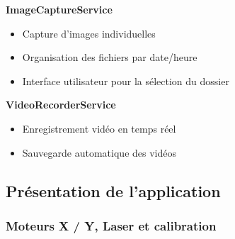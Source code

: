 \textbf{ImageCaptureService}
\begin{itemize}[label=\textbullet]
    \item Capture d'images individuelles
    \item Organisation des fichiers par date/heure
    \item Interface utilisateur pour la sélection du dossier
\end{itemize}

\textbf{VideoRecorderService}
\begin{itemize}[label=\textbullet]
    \item Enregistrement vidéo en temps réel
    \item Sauvegarde automatique des vidéos
\end{itemize}

\newpage
\subsection{Présentation de l'application} \label{subsection:fenetres}
\subsubsection{Moteurs X / Y, Laser et calibration}

